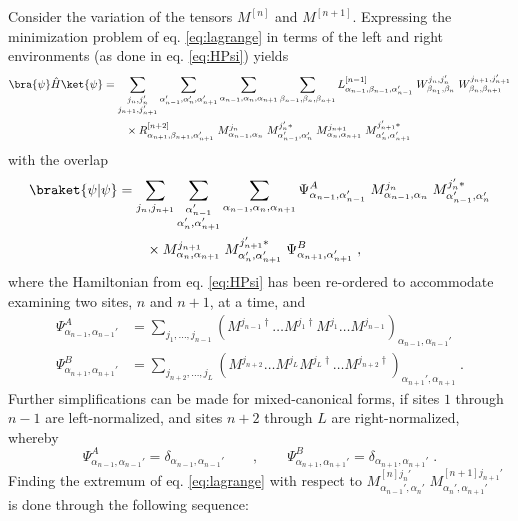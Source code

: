 Consider the variation of the tensors $M^{[n]}$ and $M^{[n+1]}$. Expressing the minimization problem of eq. \eqref{eq:lagrange} in terms of the left and right environments (as done in eq. \eqref{eq:HPsi}) yields
\begin{align}
	\bra{\psi} \hat{H} \ket{\psi} &= \sum_{\substack{j_n , j_n ' \\ j_{n+1} , j_{n+1} '}} \sum_{\alpha_{n-1} ' , \alpha_n ', \alpha_{n+1} '} \sum_{\alpha_{n-1} , \alpha_n , \alpha_{n+1}} \sum_{\beta_{n-1} , \beta_n , \beta_{n+1}} L_{\alpha_{n-1}, \beta_{n-1} , \alpha_{n-1} '}^{[n-1]} \; W_{\beta_{n_1}, \beta_n}^{j_n , j_n '} \; W_{\beta_{n}, \beta_{n+1}}^{ j_{n+1} , j_{n+1} '} \nonumber \\
	& \qquad \times R_{\alpha_{n+1} ,\beta_{n+1} , \alpha_{n+1} '}^{[n+2]} \; M_{\alpha_{n-1} , \alpha_{n}}^{j_n } \; M_{\alpha_{n-1} ' , \alpha_{n} '}^{j_n ' *} \; M_{\alpha_{n} , \alpha_{n+1}}^{j_{n+1} } \; M_{\alpha_{n} ' , \alpha_{n+1} '}^{j_{n+1} ' *}  \label{eq:twositeHamil}
\end{align}
with the overlap
\begin{align}
	\braket{\psi | \psi} &= \sum_{j_n , j_{n+1} } \sum_{\substack{\alpha_{n-1} ' \\ \alpha_n ', \alpha_{n+1} '}} \sum_{\alpha_{n-1} , \alpha_n ,\alpha_{n+1}} \Psi_{\alpha_{n-1},\alpha_{n-1}'}^{A} \; M_{\alpha_{n-1} , \alpha_{n}}^{ j_n } \; M_{\alpha_{n-1} ' , \alpha_{n} '}^{j_n ' *} \nonumber \\
	& \qquad \times M_{\alpha_{n} , \alpha_{n+1}}^{j_{n+1} } \; M_{\alpha_{n} ' , \alpha_{n+1} '}^{j_{n+1} ' *} \; \Psi_{\alpha_{n+1},\alpha_{n+1}'}^{B} \; , \label{eq:twositeOverlap}
\end{align}
where the Hamiltonian from eq. \eqref{eq:HPsi} has been re-ordered to accommodate examining two sites, $n$ and $n+1$, at a time, and 
\begin{align}
\Psi_{\alpha_{n-1},\alpha_{n-1}'}^{A} &= \sum_{j_1 , \ldots , j_{n-1}} \left( M^{j_{n-1} \dag} \ldots M^{j_{1} \dag} M^{j_1} \ldots M^{j_{n-1}} \right) _{\alpha_{n-1} , \alpha_{n-1} '} \label{eq:psiA} \\
\Psi_{\alpha_{n+1},\alpha_{n+1}'}^{B} &= \sum_{j_{n+2} , \ldots , j_{L}} \left( M^{j_{n+2} } \ldots M^{j_{L} } M^{j_L \dag} \ldots M^{j_{n+2} \dag} \right) _{\alpha_{n+1} ', \alpha_{n+1} } \; .
\end{align}
Further simplifications can be made for mixed-canonical forms, if sites $1$ through $n-1$ are left-normalized, and sites $n+2$ through $L$ are right-normalized, whereby
\begin{equation}
	\Psi_{\alpha_{n-1},\alpha_{n-1}'}^{A} = \delta_{\alpha_{n-1},\alpha_{n-1}'} \qquad , \qquad \Psi_{\alpha_{n+1},\alpha_{n+1}'}^{B} = \delta_{\alpha_{n+1},\alpha_{n+1}'} \; .
\end{equation}
Finding the extremum of eq. \eqref{eq:lagrange} with respect to $M_{\alpha_{n-1} ' , \alpha_{n} '}^{[n] j_n ' } \; M_{\alpha_{n} ' , \alpha_{n+1} '}^{[n+1] j_{n+1} ' }$ is done through the following sequence:

